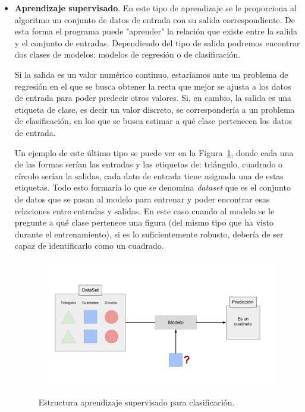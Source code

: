 \documentclass[a4paper, 12pt]{book}
\begin{document}
\begin{itemize}
    \item \textbf{Aprendizaje supervisado}. En este tipo de aprendizaje se le proporciona al algoritmo un conjunto de datos de entrada con su salida correspondiente. De esta forma el programa puede "aprender" la relación que existe entre la salida y el conjunto de entradas. Dependiendo del tipo de salida podremos encontrar dos clases de modelos: modelos de regresión o de clasificación.
    
    Si la salida es un valor numérico continuo, estaríamos ante un problema de regresión en el que se busca obtener la recta que mejor se ajusta a los datos de entrada para poder predecir otros valores. Si, en cambio, la salida es una etiqueta de clase, es decir un valor discreto, se correspondería a un problema de clasificación, en los que se busca estimar a qué clase pertenecen los datos de entrada. 
    
    Un ejemplo de este último tipo se puede ver en la Figura~\ref{fig:a_supervisado}, donde cada una de las formas serían las entradas y las etiquetas de: triángulo, cuadrado o círculo serían la salidas, cada dato de entrada tiene asignada una de estas etiquetas. Todo esto formaría lo que se denomina \textit{dataset} que es el conjunto de datos que se pasan al modelo para entrenar y poder encontrar esas relaciones entre entradas y salidas. En este caso cuando al modelo se le pregunte a qué clase pertenece una figura (del mismo tipo que ha visto durante el entrenamiento), si es lo suficientemente robusto, debería de ser capaz de identificarlo como un cuadrado.
    
    \begin{figure}[]
      \centering
      \includegraphics[width=12cm, keepaspectratio]{img/a_supervisado.png}
      \caption{Estructura aprendizaje supervisado para clasificación.}\label{fig:a_supervisado}
    \end{figure}
    

\end{itemize}
\end{document}
